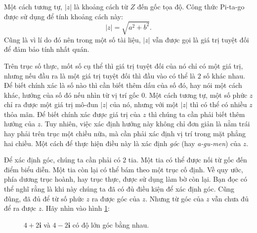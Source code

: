 \documentclass[a4paper, titlepage, openany]{book}
\numberwithin{equation}{chapter}
\begin{document}
Một cách tương tự, $|z|$ là khoảng cách từ $Z$ đến gốc tọa độ. Công thức Pi-ta-go được sử dụng để tính khoảng cách này: $$|z| = \sqrt{a^2+b^2}.$$ Cũng là vì lí do đó nên trong một số tài liệu, $|z|$ vẫn được gọi là giá trị tuyệt đối để đảm bảo tính nhất quán.

Trên trục số thực, mốt số cụ thể thì giá trị tuyệt đối của nó chỉ có một giá trị, nhưng nếu đầu ra là một giá trị tuyệt đối thì đầu vào có thể là $2$ số khác nhau. Để biết chính xác là số nào thì cần biết thêm dấu của số đó, hay nói một cách khác, hướng của số đó nếu nhìn từ vị trí gốc $0$. Một cách tương tự, một số phức $z$ chỉ ra được một giá trị mô-đun $|z|$ của nó, nhưng với một $|z|$ thì có thể có nhiều $z$ thỏa mãn. Để biết chính xác được giá trị của $z$ thì chúng ta cần phải biết thêm hướng của $z$. Tuy nhiên, việc xác định hướng này không chỉ đơn giản là nằm trái hay phải trên trục một chiều nữa, mà cần phải xác định vị trí trong mặt phẳng hai chiều. Một cách để thực hiện điều này là xác định \emph{góc} (hay \emph{a-gu-men}) của $z$.

Để xác định góc, chúng ta cần phải có $2$ tia. Một tia có thể được nối từ gốc đến điểm biểu diễn. Một tia còn lại có thể bám theo một trục cố định. Về quy ước, phía dương trục hoành, hay trục thực, được sử dụng làm bờ còn lại. Bạn đọc có thể nghĩ rằng là khi này chúng ta đã có đủ điều kiện để xác định góc. Cũng đũng, đã đủ để từ số phức $z$ ra được góc của $z$. Nhưng từ góc của $z$ vẫn chưa đủ để ra được $z$. Hãy nhìn vào hình \ref{fig:hai_truong_hop_goc}:
\begin{figure}[h]
   \centering
   \caption{$4+2\mathbf{i}$ và $4-2\mathbf{i}$ có độ lớn góc bằng nhau.}
   \label{fig:hai_truong_hop_goc}
\end{figure}
\end{document}
